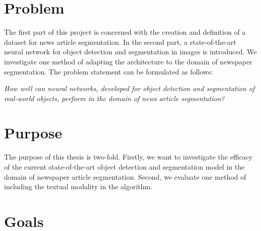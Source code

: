 \documentclass[oneside, english, bibtex]{kththesis}
\begin{document}


\section{Problem}
\label{sec:problem}

The first part of this project is concerned with the creation and definition of a dataset for news article segmentation. In the second part, a state-of-the-art neural network for object detection and segmentation in images is introduced. We investigate one method of adapting the architecture to the domain of newspaper segmentation. The problem statement can be formulated as follows:

	\textit{How well can neural networks, developed for object detection and segmentation of real-world objects, perform in the domain of news article segmentation?}

\section{Purpose}

The purpose of this thesis is two-fold. Firstly, we want to investigate the efficacy of the current state-of-the-art object detection and segmentation model in the domain of newspaper article segmentation. Second, we evaluate one method of including the textual modality in the algorithm.

\section{Goals}
\label{sec:goals}
\end{document}
